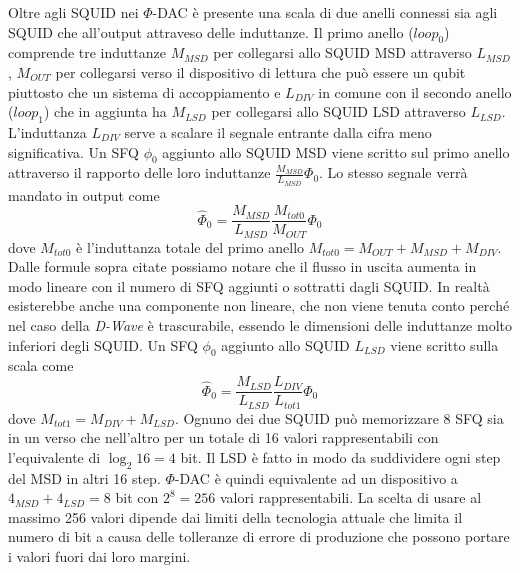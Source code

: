 Oltre agli SQUID nei $\Phi$-DAC è presente una scala di due anelli connessi sia agli SQUID che all'output attraveso delle induttanze.
Il primo anello ($loop_0$) comprende tre induttanze $M_{MSD}$ per collegarsi allo SQUID MSD attraverso $L_{MSD}$, $M_{OUT}$ per collegarsi verso il dispositivo di lettura che può essere un qubit piuttosto che un sistema di accoppiamento e $L_{DIV}$ in comune con il secondo anello ($loop_1$) che in aggiunta ha $M_{LSD}$ per collegarsi allo SQUID LSD attraverso $L_{LSD}$. L'induttanza $L_{DIV}$ serve a scalare il segnale entrante dalla cifra meno significativa.
Un SFQ $\phi_0$ aggiunto allo SQUID MSD viene scritto sul primo anello attraverso il rapporto delle loro induttanze $\frac{M_{MSD}}{L_{MSD}}\Phi_0$.
Lo stesso segnale verrà mandato in output come
$$\hat{\Phi}_0 = \frac{M_{MSD}}{L_{MSD}}\frac{M_{tot0}}{M_{OUT}}\Phi_0$$
dove $M_{tot0}$ è l'induttanza totale del primo anello $M_{tot0} = M_{OUT} + M_{MSD} + M_{DIV}$. Dalle formule sopra citate possiamo notare che il flusso in uscita aumenta in modo lineare con il numero di SFQ aggiunti o sottratti dagli SQUID. In realtà esisterebbe anche una componente non lineare, che non viene tenuta conto perché nel caso della \textit{D-Wave} è trascurabile, essendo le dimensioni delle induttanze molto inferiori degli SQUID.
Un SFQ $\phi_0$ aggiunto allo SQUID $L_{LSD}$ viene scritto sulla scala come
$$\hat{\Phi}_0 = \frac{M_{LSD}}{L_{LSD}}\frac{L_{DIV}}{L_{tot1}}\Phi_0$$
dove $M_{tot1} = M_{DIV} + M_{LSD}$. Ognuno dei due SQUID può memorizzare 8 SFQ sia in un verso che nell'altro per un totale di 16 valori rappresentabili con l'equivalente di $\log_2{16} = 4$ bit. Il LSD è fatto in modo da suddividere ogni step del MSD in altri 16 step. $\Phi$-DAC è quindi equivalente ad un dispositivo a $4_{MSD} + 4_{LSD} = 8$ bit con $2^8 = 256$ valori rappresentabili.
La scelta di usare al massimo 256 valori dipende dai limiti della tecnologia attuale che limita il numero di bit a causa delle tolleranze di errore di produzione che possono portare i valori fuori dai loro margini.

